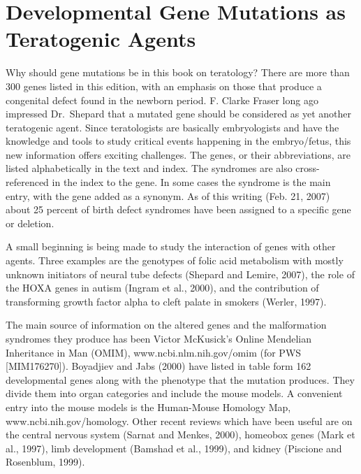 
\clearemptydoublepage
\chapter{Developmental Gene Mutations as Teratogenic Agents}

\label{gene}
Why should gene mutations be in this book on teratology?  There are
more than 300 genes listed in this edition, with an emphasis on those that
produce a congenital defect found in the newborn period.  F. Clarke
Fraser long ago impressed Dr.~Shepard that a mutated gene should be
considered as yet another teratogenic agent.  Since teratologists are
basically embryologists and have the knowledge and tools to study
critical events happening in the embryo/fetus, this new information
offers exciting challenges.  The genes, or their abbreviations, are
listed alphabetically in the text and index.  The syndromes are also
cross-referenced in the index to the gene.  In some cases the
syndrome is the main entry, with the gene added as a synonym.  As of
this writing (Feb. 21, 2007) about 25 percent of birth defect syndromes have
been assigned to a specific gene or deletion.

A small beginning is being made to study the interaction of genes
with other agents.  Three examples are the genotypes of folic acid
metabolism with mostly unknown initiators of neural tube defects
(Shepard and Lemire, 2007),
the role of the HOXA genes in autism (Ingram et al.,
2000), and the contribution of transforming growth factor alpha to
cleft palate in smokers (Werler, 1997).

The main source of information on the altered genes and the
malformation syndromes they produce has been Victor McKusick's Online
Mendelian Inheritance in Man (OMIM), 
www.ncbi.nlm.nih.gov/omim (for PWS [MIM176270]).  Boyadjiev
and Jabs (2000) have listed in table form 162 developmental genes
along with the phenotype that the mutation produces.  They divide
them into organ categories and include the mouse models.  A
convenient entry into the mouse models is the Human-Mouse Homology
Map,
www.ncbi.nih.gov/homology.
Other recent reviews which have been useful are on the central
nervous system (Sarnat and Menkes, 2000), homeobox genes (Mark et
al., 1997), limb development (Bamshad et al., 1999), and kidney
(Piscione and Rosenblum, 1999).



